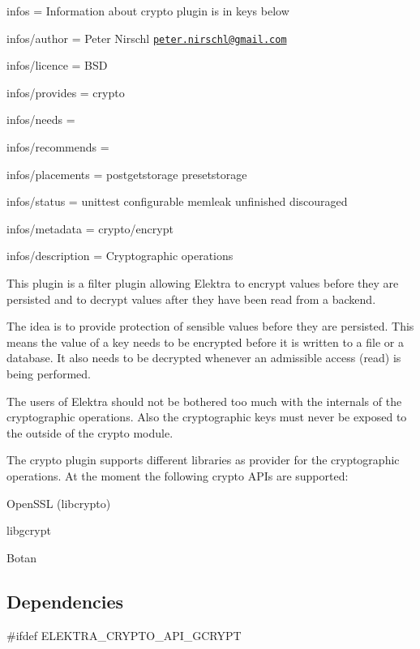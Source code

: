 
\begin{DoxyItemize}
\item infos = Information about crypto plugin is in keys below
\item infos/author = Peter Nirschl \href{mailto:peter.nirschl@gmail.com}{\tt peter.\+nirschl@gmail.\+com}
\item infos/licence = B\+SD
\item infos/provides = crypto
\item infos/needs =
\item infos/recommends =
\item infos/placements = postgetstorage presetstorage
\item infos/status = unittest configurable memleak unfinished discouraged
\item infos/metadata = crypto/encrypt
\item infos/description = Cryptographic operations
\end{DoxyItemize}

This plugin is a filter plugin allowing Elektra to encrypt values before they are persisted and to decrypt values after they have been read from a backend.

The idea is to provide protection of sensible values before they are persisted. This means the value of a key needs to be encrypted before it is written to a file or a database. It also needs to be decrypted whenever an admissible access (read) is being performed.

The users of Elektra should not be bothered too much with the internals of the cryptographic operations. Also the cryptographic keys must never be exposed to the outside of the crypto module.

The crypto plugin supports different libraries as provider for the cryptographic operations. At the moment the following crypto A\+P\+Is are supported\+:


\begin{DoxyItemize}
\item Open\+S\+SL ({\ttfamily libcrypto})
\item libgcrypt
\item Botan
\end{DoxyItemize}

\subsection*{Dependencies}

\#ifdef E\+L\+E\+K\+T\+R\+A\+\_\+\+C\+R\+Y\+P\+T\+O\+\_\+\+A\+P\+I\+\_\+\+G\+C\+R\+Y\+PT


